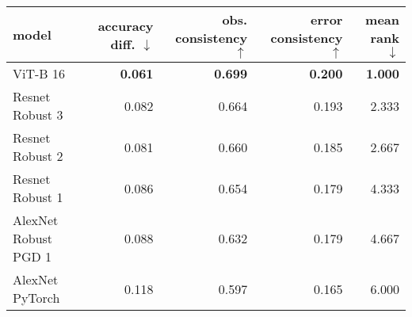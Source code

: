 \begin{tabular}{lrrrr}
\toprule
model & accuracy diff. $\downarrow$ & obs. consistency $\uparrow$ & error consistency $\uparrow$ & mean rank $\downarrow$ \\
\midrule
ViT-B 16 & \textbf{0.061} & \textbf{0.699} & \textbf{0.200} & \textbf{1.000} \\
Resnet Robust 3 & 0.082 & 0.664 & 0.193 & 2.333 \\
Resnet Robust 2 & 0.081 & 0.660 & 0.185 & 2.667 \\
Resnet Robust 1 & 0.086 & 0.654 & 0.179 & 4.333 \\
AlexNet Robust PGD 1 & 0.088 & 0.632 & 0.179 & 4.667 \\
AlexNet PyTorch & 0.118 & 0.597 & 0.165 & 6.000 \\
\bottomrule
\end{tabular}

